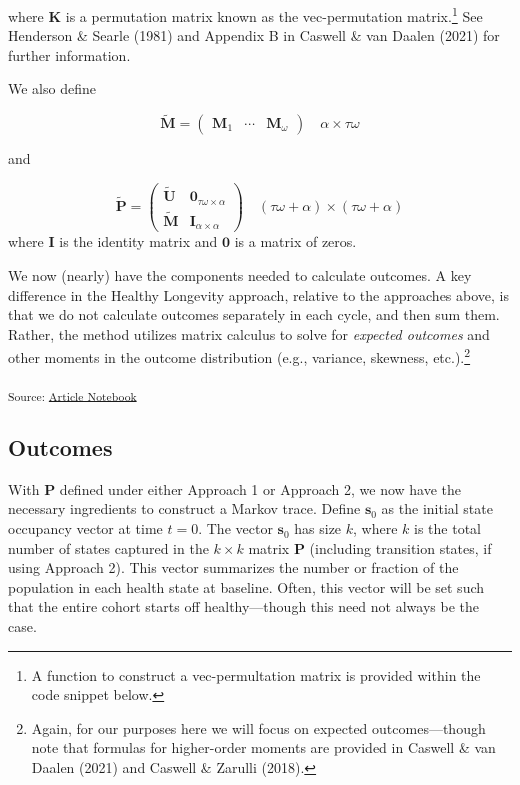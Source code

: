 \documentclass[
]{agujournal2019}
\begin{document}
where \(\mathbf{K}\) is a permutation matrix known as the
vec-permutation matrix.\footnote{A function to construct a
  vec-permultation matrix is provided within the code snippet below.}
See Henderson \& Searle (1981) and Appendix B in Caswell \& van Daalen
(2021) for further information.

We also define

\[
\tilde{\mathbf{M}}=\left(\begin{array}{lll}
\mathbf{M}_1 & \cdots & \mathbf{M}_\omega
\end{array}\right) \quad \alpha \times \tau \omega
\]

and

\[
\tilde{\mathbf{P}}=\left(\begin{array}{c|c}
\tilde{\mathbf{U}} & \mathbf{0}_{\tau \omega \times \alpha} \\
\hline \tilde{\mathbf{M}} & \mathbf{I}_{\alpha \times \alpha}
\end{array}\right) \quad(\tau \omega+\alpha) \times(\tau \omega+\alpha)
\] where \(\mathbf{I}\) is the identity matrix and \(\mathbf{0}\) is a
matrix of zeros.

We now (nearly) have the components needed to calculate outcomes. A key
difference in the Healthy Longevity approach, relative to the approaches
above, is that we do not calculate outcomes separately in each cycle,
and then sum them. Rather, the method utilizes matrix calculus to solve
for \emph{expected outcomes} and other moments in the outcome
distribution (e.g., variance, skewness, etc.).\footnote{Again, for our
  purposes here we will focus on expected outcomes---though note that
  formulas for higher-order moments are provided in Caswell \& van
  Daalen (2021) and Caswell \& Zarulli (2018).}

\textsubscript{Source:
\href{https://graveja0.github.io/dalys/index.qmd.html}{Article
Notebook}}

\subsection{Outcomes}\label{outcomes}

With \(\mathbf{P}\) defined under either Approach 1 or Approach 2, we
now have the necessary ingredients to construct a Markov trace. Define
\(\mathbf{s}_0\) as the initial state occupancy vector at time \(t=0\).
The vector \(\mathbf{s}_0\) has size \(k\), where \(k\) is the total
number of states captured in the \(k \times k\) matrix \(\mathbf{P}\)
(including transition states, if using Approach 2). This vector
summarizes the number or fraction of the population in each health state
at baseline. Often, this vector will be set such that the entire cohort
starts off healthy---though this need not always be the case.
\end{document}
